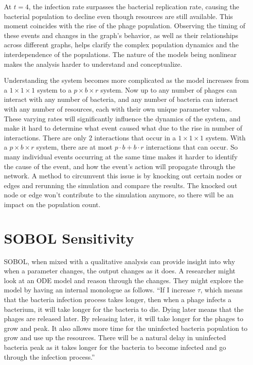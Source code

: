 At $t=4$, the infection rate surpasses the bacterial replication rate, causing the bacterial population to decline even though resources are still available. 
This moment coincides with the rise of the phage population. 
Observing the timing of these events and changes in the graph's behavior, as well as their relationships across different graphs, helps clarify the complex population dynamics and the interdependence of the populations. 
The nature of the models being nonlinear makes the analysis harder to understand and conceptualize. 

Understanding the system becomes more complicated as the model increases from a $1\times1\times1$ system to a $p\times b\times r$ system. 
Now up to any number of phages can interact with any number of bacteria, and any number of bacteria can interact with any number of resources, each with their own unique parameter values. 
These varying rates will significantly influence the dynamics of the system, and make it hard to determine what event caused what due to the rise in number of interactions.
There are only 2 interactions that occur in a $1\times1\times1$ system. 
With a $p\times b\times r$ system, there are at most $p\cdot b + b\cdot r$ interactions that can occur. 
So many individual events occurring at the same time makes it harder to identify the cause of the event, and how the event's action will propagate through the network. 
A method to circumvent this issue is by knocking out certain nodes or edges and rerunning the simulation and compare the results. 
The knocked out node or edge won't contribute to the simulation anymore, so there will be an impact on the population count. 

\section{SOBOL Sensitivity}
SOBOL, when mixed with a qualitative analysis can provide insight into why when a parameter changes, the output changes as it does. 
A researcher might look at an ODE model and reason through the changes. 
They might explore the model by having an internal monologue as follows. 
“If I increase $\tau$, which means that the bacteria infection process takes longer, then when a phage infects a bacterium, it will take longer for the bacteria to die. 
Dying later means that the phages are released later. 
By releasing later, it will take longer for the phages to grow and peak. 
It also allows more time for the uninfected bacteria population to grow and use up the resources. 
There will be a natural delay in uninfected bacteria peak as it takes longer for the bacteria to become infected and go through the infection process.” 


